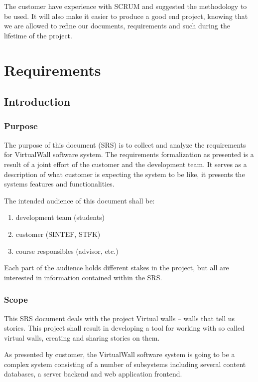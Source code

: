 \documentclass[11pt]{book}
\begin{document}
The customer have experience with SCRUM and suggested the methodology to be used. It will also make it easier to produce a good end project, knowing that we are allowed to refine our documents, requirements and such during the lifetime of the project.

\chapter{Requirements}
\section{Introduction}

\subsection{Purpose}
The purpose of this document (SRS) is to collect and analyze the requirements for VirtualWall software system. The requirements formalization as presented is a result of a joint effort of the customer and the development team. It serves as a description of what customer is expecting the system to be like, it presents the systems features and functionalities.

The intended audience of this document shall be:

\begin{enumerate}
  \item development team (students)
  \item customer (SINTEF, STFK)
  \item course responsibles (advisor, etc.)
\end{enumerate}

Each part of the audience holds different stakes in the project, but all are interested in information contained within the SRS.

\subsection{Scope}
This SRS document deals with the project Virtual walls – walls that tell us stories. This project shall result in developing a tool for working with so called virtual walls, creating and sharing stories on them.

As presented by customer, the VirtualWall software system is going to be a complex system consisting of a number of subsystems including several content databases, a server backend and web application frontend.
\end{document}

